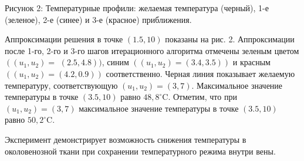 \documentclass[10pt]{article}
\begin{document}
Рисунок 2: Температурные профили: желаемая температура (черный),
1-е (зеленое), 2-е (синее) и 3-е (красное) приближения.

Аппроксимации решения в точке $(1.5,10)$ показаны на рис. 2.
Аппроксимации после 1-го, 2-го и 3-го шагов итерационного алгоритма отмечены зеленым
цветом
$\left(\left(u_{1 }, u_{2}\right)=\right.$ $(2.5,4.8))$,
синим  $\left(\left(u_{1}, u_{2}\right)=(3.4,3.5)\right)$
и красным $\left(\left(u_{1}, u_{2}\right)=(4.2,0.9)\right)$ соответственно.
Черная линия показывает желаемую температуру, соответствующую
$\left(u_{1}, u_{2}\right)=(3,7)$.
Максимальное значение температуры в точке $(3.5,10)$ равно $48,8^{\circ}\mathrm{C}$.
Отметим, что при $\left(u_{1}, u_{2}\right)=(3,7)$ максимальное значение
температуры в точке $(3.5,10)$ равно $50,2^{ \circ} \mathrm{C}$.

Эксперимент демонстрирует возможность снижения температуры в
околовенозной ткани при сохранении температурного режима внутри вены.
\end{document}
